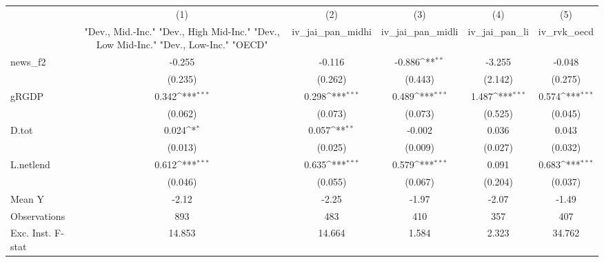 {
\def\sym#1{\ifmmode^{#1}\else\(^{#1}\)\fi}
\begin{tabular}{l*{5}{c}}
\toprule
            &\multicolumn{1}{c}{(1)}&\multicolumn{1}{c}{(2)}&\multicolumn{1}{c}{(3)}&\multicolumn{1}{c}{(4)}&\multicolumn{1}{c}{(5)}\\
            &\multicolumn{1}{c}{ "Dev., Mid.-Inc." "Dev., High Mid-Inc." "Dev., Low Mid-Inc." "Dev., Low-Inc." "OECD" }&\multicolumn{1}{c}{iv\_jai\_pan\_midhi}&\multicolumn{1}{c}{iv\_jai\_pan\_midli}&\multicolumn{1}{c}{iv\_jai\_pan\_li}&\multicolumn{1}{c}{iv\_rvk\_oecd}\\
\midrule
news\_f2     &      -0.255         &      -0.116         &      -0.886\sym{**} &      -3.255         &      -0.048         \\
            &     (0.235)         &     (0.262)         &     (0.443)         &     (2.142)         &     (0.275)         \\
\addlinespace
gRGDP       &       0.342\sym{***}&       0.298\sym{***}&       0.489\sym{***}&       1.487\sym{***}&       0.574\sym{***}\\
            &     (0.062)         &     (0.073)         &     (0.073)         &     (0.525)         &     (0.045)         \\
\addlinespace
D.tot       &       0.024\sym{*}  &       0.057\sym{**} &      -0.002         &       0.036         &       0.043         \\
            &     (0.013)         &     (0.025)         &     (0.009)         &     (0.027)         &     (0.032)         \\
\addlinespace
L.netlend   &       0.612\sym{***}&       0.635\sym{***}&       0.579\sym{***}&       0.091         &       0.683\sym{***}\\
            &     (0.046)         &     (0.055)         &     (0.067)         &     (0.204)         &     (0.037)         \\
\midrule
Mean Y      &       -2.12         &       -2.25         &       -1.97         &       -2.07         &       -1.49         \\
Observations&         893         &         483         &         410         &         357         &         407         \\
Exc. Inst. F-stat&      14.853         &      14.664         &       1.584         &       2.323         &      34.762         \\
\bottomrule
\end{tabular}
}
